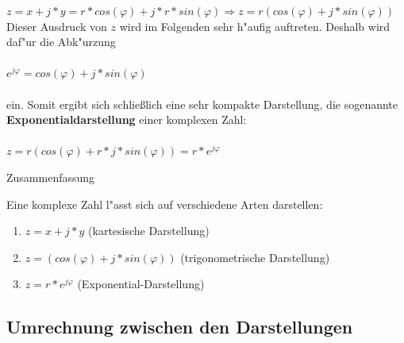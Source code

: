 		$z=x+j*y =r*cos(\varphi)+j*r*sin(\varphi) \Rightarrow z=r(cos(\varphi)+j*sin(\varphi))$\\

		Dieser Ausdruck von $z$ wird im Folgenden sehr h"aufig auftreten. Deshalb wird daf"ur die Abk"urzung\\
		\\
		$e^{j\varphi} =cos(\varphi)+j*sin(\varphi)$\\
		\\
		ein.
		Somit ergibt sich schließlich eine sehr kompakte Darstellung, die sogenannte \textbf{Exponentialdarstellung} einer komplexen Zahl:\\\\
		$z=  {r(cos(\varphi)+r*j*sin(\varphi))}=r*e^{j\varphi}$

		\begin{Bemerkung}
		Zusammenfassung\\
		\end{Bemerkung}

		Eine komplexe Zahl l"asst sich auf verschiedene Arten darstellen:\\


		\begin{tcolorbox}

		\begin{enumerate}

		\item $z=x+j*y$ (kartesische Darstellung)
		\item $z=(cos(\varphi)+j*sin(\varphi))$ (trigonometrische Darstellung)
		\item $z=r*e^{j\varphi}$ (Exponential-Darstellung)\\

		\end{enumerate}

		\end{tcolorbox}


	\subsection{Umrechnung zwischen den Darstellungen}
